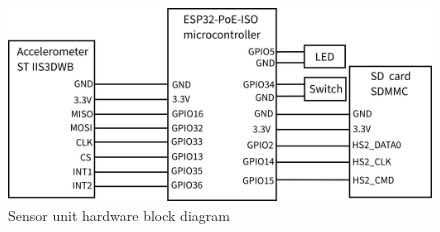 \begin{figure}[h]
	\centering
	\includegraphics[width=\textwidth]{assets/design/hw-block-schematic.png}
	\caption{Sensor unit hardware block diagram}
\end{figure}


